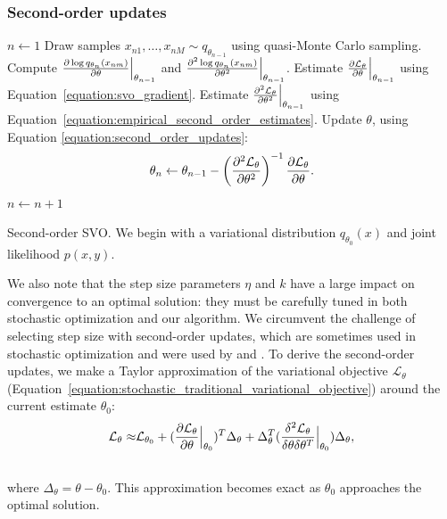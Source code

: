 \subsubsection{Second-order updates}
\label{section:second_order_updates}
  \begin{algorithm}[tb]
    \begin{algorithmic}[1]
    \setlength{\topsep}{1pt}
    \setlength{\itemsep}{2pt}
    \setlength{\parskip}{1pt}
    \setlength{\parsep}{1pt}

    \STATE $n \gets 1$
    \STATE Draw samples $x_{n1}, \ldots, x_{nM} \sim q_{\theta_{n - 1}}$ using quasi-Monte Carlo sampling.
    \STATE Compute $\frac{\partial \log q_{\theta_n}(x_{nm})}{\partial \theta} \Bigr|_{\theta_{n-1}}$ and
    $\frac{\partial^2 \log q_{\theta_n}(x_{nm})}{\partial {\theta}^2} \Bigr|_{\theta_{n-1}}$. %
    \STATE Estimate $\frac{\partial \mathcal{L}_\theta }{\partial \theta} \Bigr|_{\theta_{n-1}}$ using Equation~\ref{equation:svo_gradient}.
    \STATE Estimate $\frac{\partial^2 \mathcal{L}_\theta }{\partial {\theta}^2} \Bigr|_{\theta_{n-1}}$ using Equation~\ref{equation:empirical_second_order_estimates}.
    \STATE Update $\theta$, using Equation \ref{equation:second_order_updates}:
        \vspace{-10pt}
	\begin{align*}
     	   \displaystyle \theta_n \gets \theta_{n-1} - \left( 
     	\frac{\partial^2 \mathcal{L}_\theta }{\partial {\theta}^2}
     	\right)^{-1}
     	\frac{\partial \mathcal{L}_\theta }{\partial \theta}.  \end{align*}
    \vspace{-15pt}
    \STATE $n \gets n + 1$ %
    \ENDWHILE
  \end{algorithmic}
  \caption{Second-order SVO. We begin with a variational distribution
$q_{\theta_0}(x)$ and joint likelihood $p(x, y)$.  }
  \label{figure:second_order_algorithm}
\end{algorithm}
We also note that the step size parameters $\eta$ and $k$ have a large
impact on convergence to an optimal solution: they must be carefully
tuned in both stochastic optimization and our algorithm. We circumvent
the challenge of selecting step size with second-order updates, which
are sometimes used in stochastic optimization
\cite{robbins:1951,bottou:2004} and were used by
\citet{carbonetto:2009} and \citet{wei:1990}.  To derive the
second-order updates, we make a Taylor approximation of the
variational objective $\mathcal{L}_\theta$
(Equation~\ref{equation:stochastic_traditional_variational_objective}) around the
current estimate $\theta_0$:
\begin{align}
  \mathcal{L}_\theta \approx & \mathcal{L}_{\theta_0} + ( \frac{\partial \mathcal{L}_\theta }{\partial \theta} \Bigr|_{\theta_0} )^T \Delta_\theta
 + \Delta_\theta^T ( \frac{\delta^2 \mathcal{L}_\theta }{\delta \theta \delta \theta^T} \Bigr|_{\theta_0} ) \Delta_\theta, \\ \nonumber
\end{align}
where $\Delta_\theta = \theta - \theta_0$.  This approximation becomes
exact as $\theta_0$ approaches the optimal solution.

